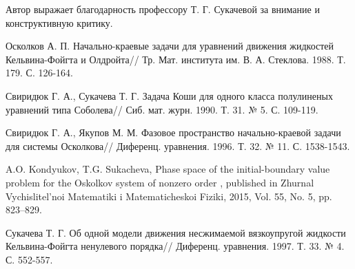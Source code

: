 Автор выражает благодарность профессору Т. Г. Сукачевой за внимание и конструктивную критику.
%

%

\begin{thebibliography}{9} %
 Осколков А. П. Начально-краевые задачи для уравнений движения жидкостей Кельвина-Фойгта и Олдройта// Тр. Мат. института им. В. А. Стеклова. 1988. Т. 179. С. 126-164.





 Свиридюк Г. А., Сукачева Т. Г. Задача Коши для одного класса полулиненых уравнений типа Соболева// Сиб. мат. журн. 1990. Т. 31. № 5. С. 109-119.

 Свиридюк Г. А., Якупов М. М. Фазовое пространство начально-краевой задачи для системы  Осколкова// Диференц. уравнения. 1996. Т. 32. № 11. С. 1538-1543.

 A.O. Kondyukov, T.G. Sukacheva, Phase space of the initial-boundary value problem for the Oskolkov system of nonzero order , published in Zhurnal Vychislitel’noi Matematiki i Matematicheskoi Fiziki, 2015, Vol. 55, No. 5, pp. 823–829.

 Сукачева Т. Г. Об одной модели движения несжимаемой вязкоупругой жидкости Кельвина-Фойгта ненулевого порядка// Диференц. уравнения. 1997. Т. 33. № 4. С. 552-557.

\end{thebibliography}





%

